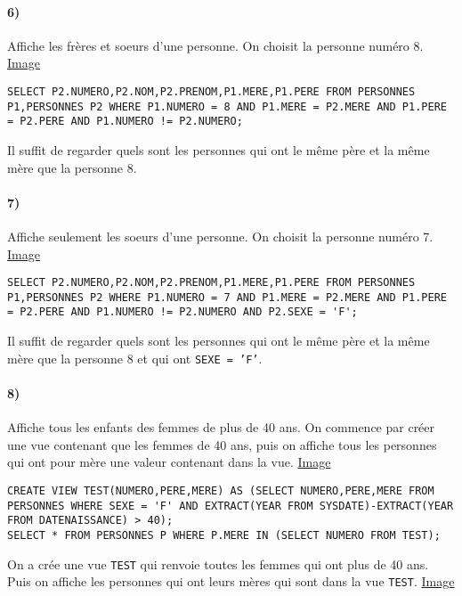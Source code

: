 \documentclass{report}
\begin{document}
\paragraph{6)}Affiche les frères et soeurs d'une personne. On choisit la personne numéro 8. \href{run:./Images/TP7/tp7_6.png}{Image}

\begin{lstlisting}
SELECT P2.NUMERO,P2.NOM,P2.PRENOM,P1.MERE,P1.PERE FROM PERSONNES P1,PERSONNES P2 WHERE P1.NUMERO = 8 AND P1.MERE = P2.MERE AND P1.PERE = P2.PERE AND P1.NUMERO != P2.NUMERO;
\end{lstlisting}

Il suffit de regarder quels sont les personnes qui ont le même père et la même mère que la personne 8.

\paragraph{7)}Affiche seulement les soeurs d'une personne. On choisit la personne numéro 7. \href{run:./Images/TP7/tp7_7.png}{Image}

\begin{lstlisting}
SELECT P2.NUMERO,P2.NOM,P2.PRENOM,P1.MERE,P1.PERE FROM PERSONNES P1,PERSONNES P2 WHERE P1.NUMERO = 7 AND P1.MERE = P2.MERE AND P1.PERE = P2.PERE AND P1.NUMERO != P2.NUMERO AND P2.SEXE = 'F';
\end{lstlisting}

Il suffit de regarder quels sont les personnes qui ont le même père et la même mère que la personne 8 et qui ont {\tt SEXE = 'F'}.

\paragraph{8)}Affiche tous les enfants des femmes de plus de 40 ans. On commence par créer une vue contenant que les femmes de 40 ans, puis on affiche tous les personnes qui ont pour mère une valeur contenant dans la vue. \href{run:./Images/TP7/tp7_8.png}{Image}

\begin{lstlisting}
CREATE VIEW TEST(NUMERO,PERE,MERE) AS (SELECT NUMERO,PERE,MERE FROM PERSONNES WHERE SEXE = 'F' AND EXTRACT(YEAR FROM SYSDATE)-EXTRACT(YEAR FROM DATENAISSANCE) > 40);
SELECT * FROM PERSONNES P WHERE P.MERE IN (SELECT NUMERO FROM TEST);
\end{lstlisting}

On a crée une vue {\tt TEST} qui renvoie toutes les femmes qui ont plus de 40 ans. Puis on affiche les personnes qui ont leurs mères qui sont dans la vue {\tt TEST}. \href{run:./Images/TP7/tp7_vue4.png}{Image}
\end{document}
